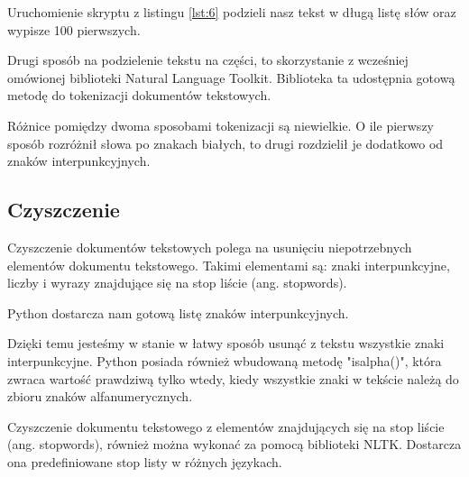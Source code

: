     Uruchomienie skryptu z listingu \ref{lst:6} podzieli nasz tekst w długą listę słów oraz wypisze 100 pierwszych.
    
    
    Drugi sposób na podzielenie tekstu na części, to skorzystanie z wcześniej omówionej biblioteki Natural Language Toolkit. Biblioteka ta udostępnia gotową metodę do tokenizacji dokumentów tekstowych.
    
    
    
    
    Różnice pomiędzy dwoma sposobami tokenizacji są niewielkie. 
    O ile pierwszy sposób rozróżnił słowa po znakach białych, to drugi rozdzielił je dodatkowo od znaków interpunkcyjnych.
    
    
    \subsection{Czyszczenie} \label{sec:czyszczenie}
    Czyszczenie dokumentów tekstowych polega na usunięciu niepotrzebnych elementów dokumentu tekstowego. Takimi elementami są: znaki interpunkcyjne, liczby i wyrazy znajdujące się na stop liście (ang. stopwords). 
    
    Python dostarcza nam gotową listę znaków interpunkcyjnych.
    
    
    Dzięki temu jesteśmy w stanie w łatwy sposób usunąć z tekstu wszystkie znaki interpunkcyjne. Python posiada również wbudowaną metodę "isalpha()", która zwraca wartość prawdziwą tylko wtedy, kiedy wszystkie znaki w tekście należą do zbioru znaków alfanumerycznych.
    
        
    Czyszczenie dokumentu tekstowego z elementów znajdujących się na stop liście (ang. stopwords), również można wykonać za pomocą biblioteki NLTK. Dostarcza ona predefiniowane stop listy w różnych językach. 
    \newpage
    
    
